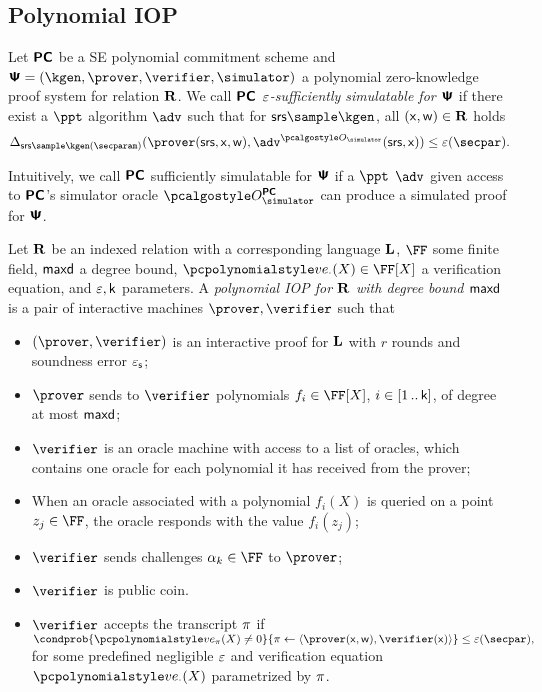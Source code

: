 \documentclass[runningheads,11pt]{llncs}
\begin{document}
\subsection{Polynomial IOP}
 \begin{definition}
   Let $\bm{\mathsf{PC}}$ be a SE polynomial commitment scheme and
   $\PS = (\kgen, \prover, \verifier, \simulator)$ a polynomial zero-knowledge proof system
   for relation $\mathbf{R}$. We call $\bm{\mathsf{PC}}$ \emph{$\varepsilon$-sufficiently simulatable for
     $\bm{\mathsf{\Psi}}$} if there exist a $\ppt$ algorithm $\adv$ such that for
   $\srs \sample \kgen$, all $(\mathsf{x}, \mathsf{w}) \in \mathbf{R}$ holds
   \[
     \SD_{\srs \sample \kgen(\secparam)}(\prover(\srs, \inp, \wit),
     \adv^{\oracles}(\srs, \inp)) \leq \eps(\secpar).
   \]
 \end{definition}
 Intuitively, we call $\bm{\mathsf{PC}}$ sufficiently simulatable for $\bm{\mathsf{\Psi}}$ if a $\ppt$
 $\adv$ given access to $\bm{\mathsf{PC}}$'s simulator oracle $\oraclespcom$ can produce a
 simulated proof for $\bm{\mathsf{\Psi}}$.

 \begin{definition}
  \label{def:piop}
  Let $\mathbf{R}$ be an indexed relation with a corresponding language $\mathbf{L}$, $\FF$
  some finite field, $\mathsf{maxd}$ a degree bound, $\vereq_{\cdot}(X) \in \FF[X]$ a
  verification equation, and $\varepsilon, \mathsf{k}$ parameters.
  A \emph{polynomial
    IOP for $\mathbf{R}$ with degree bound $\mathsf{maxd}$} is a pair of interactive
  machines $\prover, \verifier$ such that
\begin{itemize}
\item $(\prover, \verifier)$ is an interactive proof for $\mathbf{L}$ with $r$ rounds
  and soundness error $\varepsilon_{\mathsf{s}}$;
\item $\prover$ sends to $\verifier$ polynomials $f_i \in \FF[X]$,
  $i \in [1 \, .. \, \mathsf{k}]$, of degree at most $\mathsf{maxd}$;
\item $\verifier$ is an oracle machine with access to a list of oracles, which
  contains one oracle for each polynomial it has received from the prover;
\item When an oracle associated with a polynomial $f_i(X)$ is queried on a point
  $z_j \in \FF$, the oracle responds with the value $f_i(z_j)$; 
\item $\verifier$ sends challenges $\alpha_k \in \FF$ to $\prover$;
\item $\verifier$ is public coin.
\item $\verifier$ accepts the transcript $\pi$ if
  \(
    \condprob{\vereq_{\zkproof}(X) \neq 0}{\zkproof \gets \langle\prover(\inp,
        \wit), \verifier(\inp)\rangle} \leq \eps(\secpar),
  \)
  for some predefined negligible $\varepsilon$ and verification equation $\vereq_{\cdot}(X)$
  parametrized by $\pi$.
\end{itemize}
\end{definition}
\end{document}
